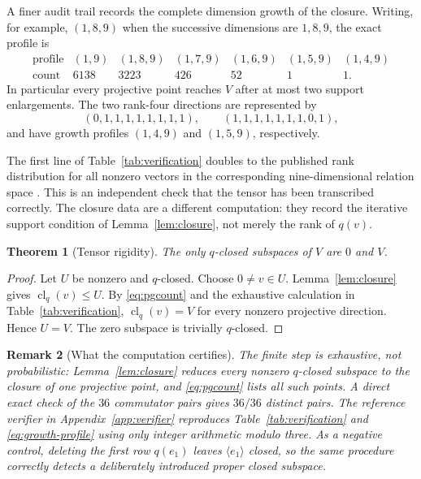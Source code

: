 \documentclass[10pt,a4paper]{amsart}
\newtheorem{theorem}{Theorem}[section]
\newtheorem{remark}[theorem]{Remark}
\newcommand{\clq}{\operatorname{cl}_q}
\begin{document}
A finer audit trail records the complete dimension growth of the closure.
Writing, for example, $(1,8,9)$ when the successive dimensions are
$1,8,9$, the exact profile is
\begin{equation}\label{eq:growth-profile}
\begin{array}{c|rrrrrr}
\text{profile}&(1,9)&(1,8,9)&(1,7,9)&(1,6,9)&(1,5,9)&(1,4,9)\\
\hline
\text{count}&6138&3223&426&52&1&1.
\end{array}
\end{equation}
In particular every projective point reaches $V$ after at most two support
enlargements.  The two rank-four directions are represented by
\begin{equation}\label{eq:rank4-points}
 (0,1,1,1,1,1,1,1,1),\qquad
 (1,1,1,1,1,1,1,0,1),
\end{equation}
and have growth profiles $(1,4,9)$ and $(1,5,9)$, respectively.

The first line of Table~\ref{tab:verification} doubles to the published
rank distribution for all nonzero vectors in the corresponding
nine-dimensional relation space \cite[p.~5]{AFLObrien10}.  This is an
independent check that the tensor has been transcribed correctly.  The
closure data are a different computation: they record the iterative
support condition of Lemma~\ref{lem:closure}, not merely the rank of
$q(v)$.

\begin{theorem}[Tensor rigidity]\label{thm:rigidity}
The only $q$-closed subspaces of $V$ are $0$ and $V$.
\end{theorem}

\begin{proof}
Let $U$ be nonzero and $q$-closed.  Choose $0\neq v\in U$.
Lemma~\ref{lem:closure} gives $\clq(v)\leq U$.  By
\eqref{eq:pgcount} and the exhaustive calculation in
Table~\ref{tab:verification}, $\clq(v)=V$ for every nonzero projective
direction.  Hence $U=V$.  The zero subspace is trivially $q$-closed.
\end{proof}

\begin{remark}[What the computation certifies]\label{rem:certificate}
The finite step is exhaustive, not probabilistic: Lemma~\ref{lem:closure}
reduces every nonzero $q$-closed subspace to the closure of one projective
point, and \eqref{eq:pgcount} lists all such points.  A direct exact check
of the $36$ commutator pairs gives $36/36$ distinct pairs.  The reference
verifier in Appendix~\ref{app:verifier} reproduces
Table~\ref{tab:verification} and \eqref{eq:growth-profile} using only
integer arithmetic modulo three.  As a negative control, deleting the
first row $q(e_1)$ leaves $\langle e_1\rangle$ closed, so the same
procedure correctly detects a deliberately introduced proper closed
subspace.
\end{remark}
\end{document}
